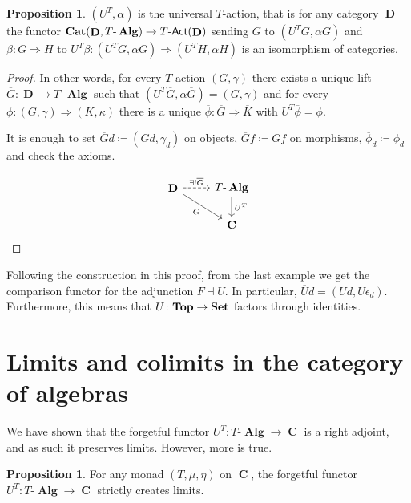 \documentclass[a4paper,11pt,twoside, openany]{book}
\newcommand{\catname}[1]{{\normalfont\textbf{#1}}}
\DeclareMathOperator{\Alg}{\mathbf{Alg}}
\newcommand{\Set}{\catname{Set}}
\newcommand{\Top}{\catname{Top}}
\newcommand{\Cat}{\catname{Cat}}
\DeclareMathOperator{\C}{\mathbf{C}}
\DeclareMathOperator{\D}{\mathbf{D}}
\theoremstyle{definition}
\theoremstyle{definition}
\newtheorem{prop}[thm]{Proposition}
\theoremstyle{remark}
\begin{document}
	\begin{prop}
		$(U^T,\alpha)$ is the universal $T$-action, that is for any category $\D$ the functor $\Cat(\D,T\mbox{-}\Alg)\rightarrow T\mbox{-}\mathsf{Act}(\D)$ sending $G$ to $(U^TG,\alpha G)$ and $\beta\colon G\Rightarrow H$ to $U^T\beta\colon(U^TG,\alpha G)\Rightarrow (U^TH,\alpha H)$ is an isomorphism of categories.
	\end{prop}
	
	\begin{proof}
		In other words, for every $T$-action $(G,\gamma)$ there exists a unique lift $\overline{G}\colon\D\rightarrow T\mbox{-}\Alg$ such that $(U^T\overline{G},\alpha\overline{G})=(G,\gamma)$ and for every $\phi\colon(G,\gamma)\Rightarrow (K,\kappa)$ there is a unique $\overline{\phi}\colon\overline{G}\Rightarrow\overline{K}$ with $U^T\overline{\phi}=\phi$.
		
		It is enough to set $\overline{G}d\coloneqq(Gd,\gamma_d)$ on objects, $\overline{G}f\coloneqq Gf$ on morphisms, $\overline{\phi}_d\coloneqq\phi_d$ and check the axioms.
		
		\[
		\begin{tikzcd}
		\D\ar[r, dashed, "\exists!\overline{G}"]\ar[dr, swap, "G"]
		& T\mbox{-}\Alg\ar[d, "U^T"] \\
		& \C
		\end{tikzcd}    
		\]			
	\end{proof}
	
	Following the construction in this proof, from the last example we get the comparison functor for the adjunction $F\dashv U$. In particular, $\overline{U}d=(Ud,U\epsilon_d)$. Furthermore, this means that $U\colon\Top\rightarrow\Set$ factors through identities.
	
	
	\section{Limits and colimits in the category of algebras}
	
	We have shown that the forgetful functor $U^T\colon T\mbox{-}\Alg\rightarrow\C$ is a right adjoint, and as such it preserves limits. However, more is true.
	
	\begin{prop}\label{create lims}
		For any monad $(T,\mu,\eta)$ on $\C$, the forgetful functor $U^T\colon T\mbox{-}\Alg\rightarrow\C$ strictly creates limits.
	\end{prop}
	
\end{document}
